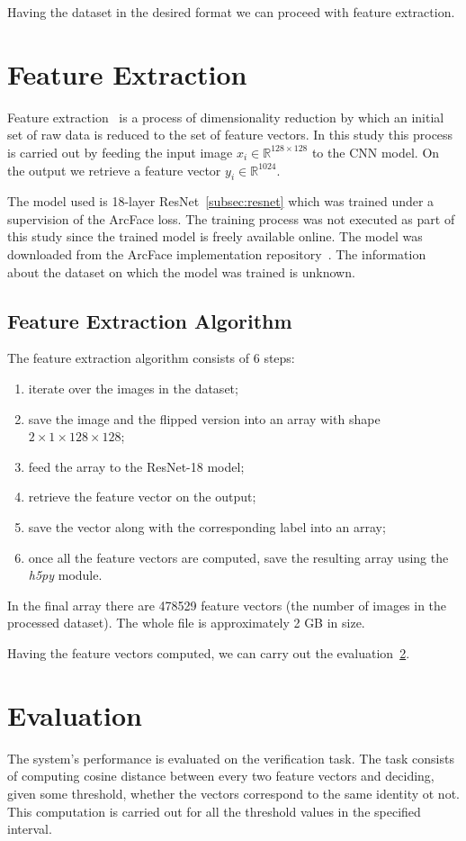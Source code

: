 Having the dataset in the desired format we can proceed with feature extraction.

\section{Feature Extraction}\label{sec:feature-extraction}
Feature extraction~\cite{FeEx} is a process of dimensionality reduction by which an initial set of raw data
is reduced to the set of feature vectors.
In this study this process is carried out by feeding the input image $x_i \in \mathbb{R}^{128\times128 }$ to the CNN model.
On the output we retrieve a feature vector $y_i \in \mathbb{R}^{1024}$.

The model used is 18-layer ResNet~\ref{subsec:resnet} which was trained under a supervision of the ArcFace loss.
The training process was not executed as part of this study since the trained model is freely available online.
The model was downloaded from the ArcFace implementation repository~\cite{ArcFacePyTorch}.
The information about the dataset on which the model was trained is unknown.

\subsection{Feature Extraction Algorithm}\label{subsec:feexalgo}
The feature extraction algorithm consists of 6 steps:
\begin{enumerate}
    \item iterate over the images in the dataset;
    \item save the image and the flipped version into an array with shape $2\times1\times128\times128$;
    \item feed the array to the ResNet-18 model;
    \item retrieve the feature vector on the output;
    \item save the vector along with the corresponding label into an array;
    \item once all the feature vectors are computed, save the resulting array using the \textit{h5py} module.
\end{enumerate}

In the final array there are 478529 feature vectors (the number of images in the processed dataset).
The whole file is approximately 2 GB in size.

Having the feature vectors computed, we can carry out the evaluation~\ref{sec:evaluation}.

\section{Evaluation}\label{sec:evaluation}
The system's performance is evaluated on the verification task.
The task consists of computing cosine distance between every two feature
vectors and deciding, given some threshold, whether the vectors correspond to the same identity ot not.
This computation is carried out for all the threshold values in the specified interval.

